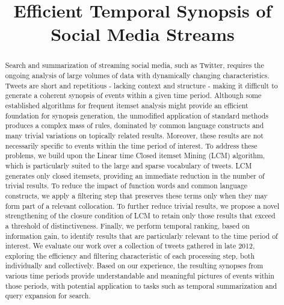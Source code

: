 \documentclass{sig-alternate}
\begin{document}
\title{Efficient Temporal Synopsis of Social Media Streams}

\maketitle
\begin{abstract}
Search and summarization of streaming social media, such as Twitter, requires the ongoing analysis of large volumes of data with dynamically changing characteristics.  Tweets are short and repetitious - lacking context and structure  - making it difficult to generate a coherent synopsis of events within a given time period.  Although some established algorithms for frequent itemset analysis might provide an efficient foundation for synopsis generation, the unmodified application of standard methods produces a complex mass of rules, dominated by common language constructs and many trivial variations on topically related results.  Moreover, these results are not necessarily specific to events within the time period of interest.  To address these problems, we build upon the Linear time Closed itemset Mining (LCM) algorithm, which is particularly suited to the large and sparse vocabulary of tweets.  LCM generates only closed itemsets, providing an immediate reduction in the number of trivial results.  To reduce the impact of function words and common language constructs, we apply a filtering step that preserves these terms only when they may form part of a relevant collocation.  To further reduce trivial results, we propose a novel strengthening of the closure condition of LCM to retain only those results that exceed a threshold of distinctiveness.  Finally, we perform temporal ranking, based on information gain, to identify results that are particularly relevant to the time period of interest.  We evaluate our work over a collection of tweets gathered in late 2012, exploring the efficiency and filtering characteristic of each processing step, both individually and collectively.  Based on our experience, the resulting synopses from various time periods provide understandable and meaningful pictures of events within those periods, with potential application to tasks such as temporal summarization and query expansion for search.
\end{abstract}
\end{document}
